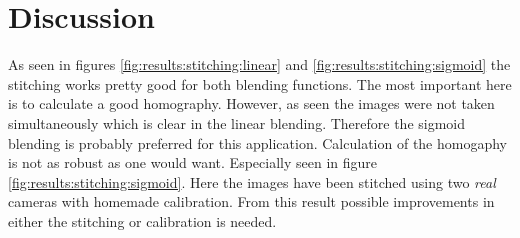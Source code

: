 \section{Discussion}
As seen in figures \ref{fig:results:stitching:linear} and \ref{fig:results:stitching:sigmoid} the stitching works pretty good for both blending functions. The most important here is to calculate a good homography. However, as seen the images were not taken simultaneously which is clear in the linear blending. Therefore the sigmoid blending is probably preferred for this application. Calculation of the homogaphy is not as robust as one would want. Especially seen in figure \ref{fig:results:stitching:sigmoid}. Here the images have been stitched using two {\it real} cameras with homemade calibration. From this result possible improvements in either the stitching or calibration is needed.
